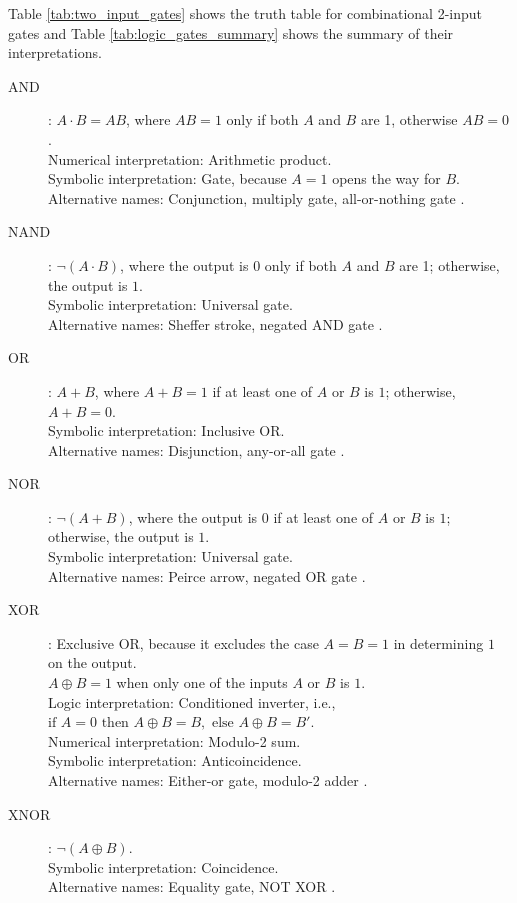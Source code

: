 Table \ref{tab:two_input_gates} shows the truth table for combinational 2-input gates and Table \ref{tab:logic_gates_summary} shows the summary of their interpretations.

\begin{description}
\item[AND]: \( A \cdot B = AB \), where \( AB = 1 \) only if both \( A \) and \( B \) are 1, otherwise \( AB = 0 \). \\
    Numerical interpretation: Arithmetic product. \\
    Symbolic interpretation:  Gate, because \( A = 1 \) opens the way for \( B \). \\
    Alternative names: Conjunction, multiply gate, all-or-nothing gate \cite{boole1854book, rosen2018}.

\item[NAND]: \( \neg (A \cdot B) \), where the output is \( 0 \) only if both \( A \) and \( B \) are 1; otherwise, the output is \( 1 \). \\
    Symbolic interpretation: Universal gate. \\
    Alternative names: Sheffer stroke, negated AND gate \cite{sheffer1913, rosen2018}.

\item[OR]: \( A + B \), where \( A + B = 1 \) if at least one of \( A \) or \( B \) is \( 1 \); otherwise, \( A + B = 0 \). \\
    Symbolic interpretation: Inclusive OR. \\
    Alternative names: Disjunction, any-or-all gate \cite{rosen2018}.

\item[NOR]: \( \neg (A + B) \), where the output is \( 0 \) if at least one of \( A \) or \( B \) is \( 1 \); otherwise, the output is \( 1 \). \\
    Symbolic interpretation: Universal gate. \\
    Alternative names: Peirce arrow, negated OR gate \cite{peirce1885, rosen2018}.

\item[XOR]: Exclusive OR, because it excludes the case \( A = B = 1 \) in determining \( 1 \) on the output. \\
    \( A \oplus B = 1 \) when only one of the inputs \( A \) or \( B \) is \( 1 \). \\
    Logic interpretation: Conditioned inverter, i.e., \( \text{if } A = 0 \text{ then } A \oplus B = B, \text{ else } A \oplus B = B' \). \\
    Numerical interpretation: Modulo-2 sum. \\
    Symbolic interpretation: Anticoincidence. \\
    Alternative names: Either-or gate, modulo-2 adder \cite{shannon48, rosen2018}.

\item[XNOR]: \( \neg (A \oplus B) \). \\
    Symbolic interpretation: Coincidence. \\
    Alternative names: Equality gate, NOT XOR \cite{mano2017, rosen2018}.
\end{description}

